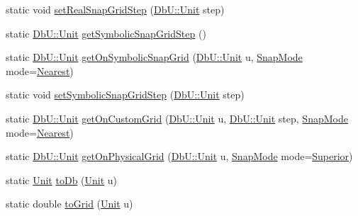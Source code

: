 \begin{DoxyCompactItemize}
\item 
static void \hyperlink{group__DbUGroup_ga202cc3aa3364c2224647a29dde047fae}{set\+Real\+Snap\+Grid\+Step} (\hyperlink{group__DbUGroup_ga4fbfa3e8c89347af76c9628ea06c4146}{Db\+U\+::\+Unit} step)
\item 
static \hyperlink{group__DbUGroup_ga4fbfa3e8c89347af76c9628ea06c4146}{Db\+U\+::\+Unit} \hyperlink{group__DbUGroup_ga687a9134729b107c42fb7f69596c4c3b}{get\+Symbolic\+Snap\+Grid\+Step} ()
\item 
static \hyperlink{group__DbUGroup_ga4fbfa3e8c89347af76c9628ea06c4146}{Db\+U\+::\+Unit} \hyperlink{group__DbUGroup_gad1b0c0f3680093cf5a63d901312c925d}{get\+On\+Symbolic\+Snap\+Grid} (\hyperlink{group__DbUGroup_ga4fbfa3e8c89347af76c9628ea06c4146}{Db\+U\+::\+Unit} u, \hyperlink{group__DbUGroup_ga1082168d6f9956ebba22ab8bbec21637}{Snap\+Mode} mode=\hyperlink{group__DbUGroup_gga1082168d6f9956ebba22ab8bbec21637a65e6f47eb16779b8974a80d6145a2db5}{Nearest})
\item 
static void \hyperlink{group__DbUGroup_ga9ccd423c8f268ef54770f4663e6c9304}{set\+Symbolic\+Snap\+Grid\+Step} (\hyperlink{group__DbUGroup_ga4fbfa3e8c89347af76c9628ea06c4146}{Db\+U\+::\+Unit} step)
\item 
static \hyperlink{group__DbUGroup_ga4fbfa3e8c89347af76c9628ea06c4146}{Db\+U\+::\+Unit} \hyperlink{group__DbUGroup_ga87323d9038656dceabffc37d45de408a}{get\+On\+Custom\+Grid} (\hyperlink{group__DbUGroup_ga4fbfa3e8c89347af76c9628ea06c4146}{Db\+U\+::\+Unit} u, \hyperlink{group__DbUGroup_ga4fbfa3e8c89347af76c9628ea06c4146}{Db\+U\+::\+Unit} step, \hyperlink{group__DbUGroup_ga1082168d6f9956ebba22ab8bbec21637}{Snap\+Mode} mode=\hyperlink{group__DbUGroup_gga1082168d6f9956ebba22ab8bbec21637a65e6f47eb16779b8974a80d6145a2db5}{Nearest})
\item 
static \hyperlink{group__DbUGroup_ga4fbfa3e8c89347af76c9628ea06c4146}{Db\+U\+::\+Unit} \hyperlink{group__DbUGroup_ga9419025221579f4277475c65655be3dc}{get\+On\+Physical\+Grid} (\hyperlink{group__DbUGroup_ga4fbfa3e8c89347af76c9628ea06c4146}{Db\+U\+::\+Unit} u, \hyperlink{group__DbUGroup_ga1082168d6f9956ebba22ab8bbec21637}{Snap\+Mode} mode=\hyperlink{group__DbUGroup_gga1082168d6f9956ebba22ab8bbec21637a8ce92cf7ff7627c46baf85612f9ad847}{Superior})
\item 
static \hyperlink{group__DbUGroup_ga4fbfa3e8c89347af76c9628ea06c4146}{Unit} \hyperlink{group__DbUGroup_gaec07c6e7ae2a2a6f54e2a16b32c8bf26}{to\+Db} (\hyperlink{group__DbUGroup_ga4fbfa3e8c89347af76c9628ea06c4146}{Unit} u)
\item 
static double \hyperlink{group__DbUGroup_ga318d673386c9424e07c12efd598c730d}{to\+Grid} (\hyperlink{group__DbUGroup_ga4fbfa3e8c89347af76c9628ea06c4146}{Unit} u)

\end{DoxyCompactItemize}
